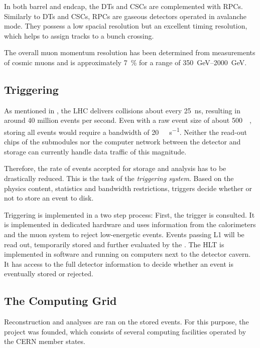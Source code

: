 In both barrel and endcap, the \acp{DT} and \acp{CSC} are complemented with \acp{RPC}. Similarly to \acp{DT} and \acp{CSC}, \acp{RPC} are gaseous detectors operated in avalanche mode. They possess a low spacial resolution but an excellent timing resolution, which helps to assign tracks to a bunch crossing.

The overall muon momentum resolution has been determined from measurements of cosmic muons and is approximately \SI{7}{\percent} for a \pT range of \SIrange{350}{2000}{\GeV}\cite{CMSCollaboration:PerformanceCMSmuon}.

\subsection{Triggering}
\label{sec:triggering}
As mentioned in , the \ac{LHC} delivers collisions about every \SI{25}{\nano\second}, resulting in around \num{40} million events per second. Even with a raw event size of about \SI{500}{\kilo\byte}\cite{CMSCollaboration:CMStriggersystem}, storing all events would require a bandwidth of \SI{20}{\tera\byte\per\second}. Neither the read-out chips of the submodules nor the computer network between the detector and storage can currently handle data traffic of this magnitude.

Therefore, the rate of events accepted for storage and analysis has to be drastically reduced. This is the task of the \emph{triggering system}. Based on the physics content, statistics and bandwidth restrictions, triggers decide whether or not to store an event to disk.

Triggering is implemented in a two step process: First, the  trigger is consulted. It is implemented in dedicated hardware and uses information from the calorimeters and the muon system to reject low-energetic events. Events passing \ac{L1} will be read out, temporarily stored and further evaluated by the . The \ac{HLT} is implemented in software and running on computers next to the detector cavern. It has access to the full detector information to decide whether an event is eventually stored or rejected\cite{CMSCollaboration:CMStriggersystem}.

\subsection{The Computing Grid}
Reconstruction and analyses are ran on the stored events. For this purpose, the  project was founded, which consists of several computing facilities operated by the \ac{CERN} member states.


